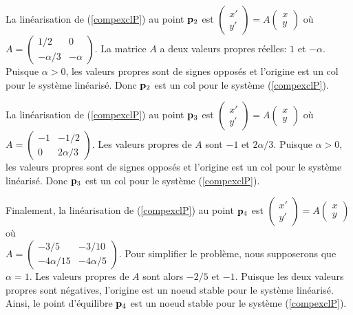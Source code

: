 {\begin{egg}
La linéarisation de (\ref{compexclP}) au point $\mathbf{p}_2$ est
$\begin{pmatrix} x' \\ y' \end{pmatrix} = A
\begin{pmatrix} x \\ y \end{pmatrix}$ où
$\displaystyle A = \begin{pmatrix} 1/2 & 0 \\
-\alpha/3 & -\alpha \end{pmatrix}$.
La matrice $A$ a deux valeurs propres réelles: $1$ et $-\alpha$.  Puisque
$\alpha >0$, les valeurs propres sont de signes opposés et l'origine
est un col pour le système linéarisé.  Donc
$\mathbf{p}_2$ est un col pour le système (\ref{compexclP}). 

La linéarisation de (\ref{compexclP}) au point $\mathbf{p}_3$
est $\begin{pmatrix} x' \\ y' \end{pmatrix} = A
\begin{pmatrix} x \\ y \end{pmatrix}$ où
$\displaystyle A = \begin{pmatrix} -1 & -1/2 \\ 0 & 2\alpha/3 \end{pmatrix}$.
Les valeurs propres de $A$ sont $-1$ et $2\alpha/3$.  Puisque
$\alpha>0$, les valeurs propres sont de signes opposés et l'origine
est un col pour le système linéarisé.  Donc
$\mathbf{p}_3$ est un col pour le système (\ref{compexclP}). 

Finalement, la linéarisation de (\ref{compexclP}) au point $\mathbf{p}_4$
est $\begin{pmatrix} x' \\ y' \end{pmatrix} = A
\begin{pmatrix} x \\ y \end{pmatrix}$ où\\
$\displaystyle A = \begin{pmatrix} -3/5 & -3/10 \\
-4\alpha/15 & -4\alpha/5 \end{pmatrix}$.
Pour simplifier le problème, nous supposerons que $\alpha = 1$.  Les
valeurs propres de $A$ sont alors $-2/5$ et $-1$.  Puisque les deux
valeurs propres sont négatives, l'origine est un noeud
stable pour le système linéarisé.  Ainsi, le point d'équilibre $\mathbf{p}_4$
est un noeud stable pour le système (\ref{compexclP}).


\end{egg}}
